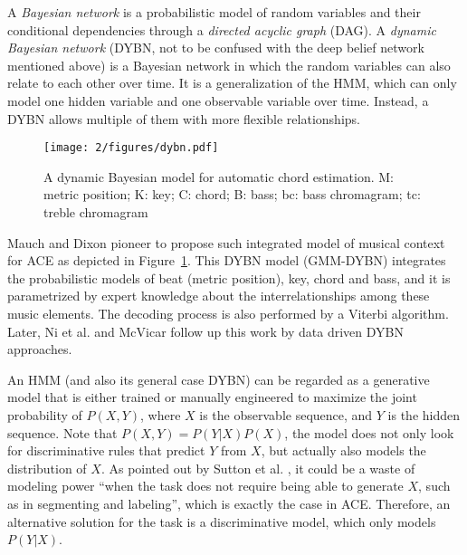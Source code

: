 A {\it Bayesian network} \cite{pearl2014probabilistic} is a probabilistic model of random variables and their conditional dependencies through a {\it directed acyclic graph} (DAG). A {\it dynamic Bayesian network} \cite{murphy2002dynamic} (DYBN, not to be confused with the deep belief network mentioned above) is a Bayesian network in which the random variables can also relate to each other over time. It is a generalization of the HMM, which can only model one hidden variable and one observable variable over time. Instead, a DYBN allows multiple of them with more flexible relationships.

\begin{figure}[htb]
\centering
\texttt{[image: 2/figures/dybn.pdf]}
\caption{A dynamic Bayesian model for automatic chord estimation. M: metric position; K: key; C: chord; B: bass; bc: bass chromagram; tc: treble chromagram}
\label{fig:2-dybn}
\end{figure}
Mauch and Dixon \cite{mauch2010approximate} pioneer to propose such integrated model of musical context for ACE as depicted in Figure~\ref{fig:2-dybn}. This DYBN model (GMM-DYBN) integrates the probabilistic models of beat (metric position), key, chord and bass, and it is parametrized by expert knowledge about the interrelationships among these music elements. The decoding process is also performed by a Viterbi algorithm. Later, Ni et al. \cite{ni2012end} and McVicar \cite{mcvicar2013machine} follow up this work by data driven DYBN approaches.

An HMM (and also its general case DYBN) can be regarded as a generative model that is either trained or manually engineered to maximize the joint probability of $P(X,Y)$, where $X$ is the observable sequence, and $Y$ is the hidden sequence. Note that $P(X,Y) = P(Y|X)P(X)$, the model does not only look for discriminative rules that predict $Y$ from $X$, but actually also models the distribution of $X$. As pointed out by Sutton et al. \cite{sutton2007dynamic}, it could be a waste of modeling power ``when the task does not require being able to generate $X$, such as in segmenting and labeling'', which is exactly the case in ACE. Therefore, an alternative solution for the task is a discriminative model, which only models $P(Y|X)$.


